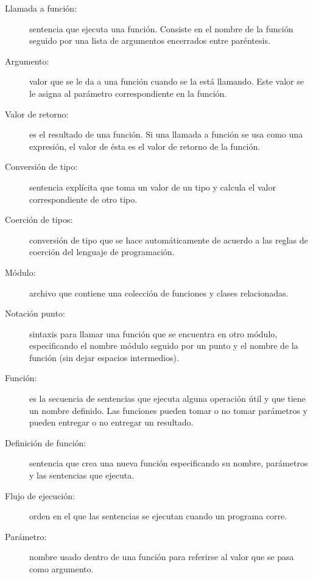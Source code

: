\begin{description}
	\item[Llamada a función:]  sentencia que ejecuta una función. Consiste en el
	nombre de la función seguido por una lista de argumentos encerrados entre
	paréntesis.
	
	\item[Argumento:]  valor que se le da a una función cuando se la está 
	llamando.
	Este valor se le asigna al parámetro correspondiente en la función.
	
	\item[Valor de retorno:]  es el resultado de una función. Si una llamada a 
	función
	se usa como una expresión, el valor de ésta es el valor de retorno de la 
	función.
	
	\item[Conversión de tipo:] sentencia explícita que toma un valor
	de un tipo y calcula el valor correspondiente de otro tipo.
	
	\item[Coerción de tipos:]  conversión de tipo que se hace automáticamente
	de acuerdo a las reglas de coerción del lenguaje de programación.
	
	\item[Módulo:]  archivo que contiene una colección de funciones y clases 
	relacionadas.
	
	\item[Notación punto:] sintaxis para llamar una función que se encuentra en 
	otro
	módulo, especificando el nombre módulo seguido por un punto y el nombre de 
	la función
	(sin dejar espacios intermedios).
	
	\item[Función:]  es la secuencia de sentencias que ejecuta alguna operación 
	útil y que tiene un nombre definido. 
	                Las funciones pueden tomar o no tomar parámetros y pueden 
	                entregar o no entregar un resultado.
	
	\item[Definición de función:]  sentencia que crea una nueva función
	especificando su nombre, parámetros y las sentencias que ejecuta.
	
	\item[Flujo de ejecución:]  orden en el que las sentencias se ejecutan 
	cuando un programa corre.
	
	\item[Parámetro:]  nombre usado dentro de una función para referirse al 
	valor
	que se pasa como argumento.
	

\end{description}
